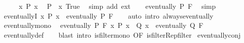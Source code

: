 \begin{isabellebody}
%
\isadelimproof
%
\endisadelimproof
%
\isatagproof
{}\isamarkupfalse%
\ {\isacharminus}{\kern0pt}\isanewline
\ \ \isamarkupfalse%
\ {\isachardoublequoteopen}{\isasymforall}x{\isachardot}{\kern0pt}\ P\ x{\isachardoublequoteclose}\ \isamarkupfalse%
\ {\isachardoublequoteopen}P\ {\isacharequal}{\kern0pt}\ {\isacharparenleft}{\kern0pt}{\isasymlambda}x{\isachardot}{\kern0pt}\ True{\isacharparenright}{\kern0pt}{\isachardoublequoteclose}\ \isamarkupfalse%
\ {\isacharparenleft}{\kern0pt}simp\ add{\isacharcolon}{\kern0pt}\ ext{\isacharparenright}{\kern0pt}\isanewline
\ \ \isamarkupfalse%
\ {\isachardoublequoteopen}eventually\ P\ F{\isachardoublequoteclose}\ \isamarkupfalse%
\ simp\isanewline
{}\isamarkupfalse%
%
\endisatagproof
{\isafoldproof}%
%
\isadelimproof
\isanewline
%
\endisadelimproof
\isanewline
{}\isamarkupfalse%
\ eventuallyI{\isacharcolon}{\kern0pt}\ {\isachardoublequoteopen}{\isacharparenleft}{\kern0pt}{\isasymAnd}x{\isachardot}{\kern0pt}\ P\ x{\isacharparenright}{\kern0pt}\ {\isasymLongrightarrow}\ eventually\ P\ F{\isachardoublequoteclose}\isanewline
%
\isadelimproof
\ \ %
\endisadelimproof
%
\isatagproof
{}\isamarkupfalse%
\ {\isacharparenleft}{\kern0pt}auto\ intro{\isacharcolon}{\kern0pt}\ always{\isacharunderscore}{\kern0pt}eventually{\isacharparenright}{\kern0pt}%
\endisatagproof
{\isafoldproof}%
%
\isadelimproof
\isanewline
%
\endisadelimproof
\isanewline
{}\isamarkupfalse%
\ eventually{\isacharunderscore}{\kern0pt}mono{\isacharcolon}{\kern0pt}\isanewline
\ \ {\isachardoublequoteopen}{\isasymlbrakk}eventually\ P\ F{\isacharsemicolon}{\kern0pt}\ {\isasymAnd}x{\isachardot}{\kern0pt}\ P\ x\ {\isasymLongrightarrow}\ Q\ x{\isasymrbrakk}\ {\isasymLongrightarrow}\ eventually\ Q\ F{\isachardoublequoteclose}\isanewline
%
\isadelimproof
\ \ %
\endisadelimproof
%
\isatagproof
{}\isamarkupfalse%
\ eventually{\isacharunderscore}{\kern0pt}def\isanewline
\ \ \isamarkupfalse%
\ {\isacharparenleft}{\kern0pt}blast\ intro{\isacharcolon}{\kern0pt}\ is{\isacharunderscore}{\kern0pt}filter{\isachardot}{\kern0pt}mono\ {\isacharbrackleft}{\kern0pt}OF\ is{\isacharunderscore}{\kern0pt}filter{\isacharunderscore}{\kern0pt}Rep{\isacharunderscore}{\kern0pt}filter{\isacharbrackright}{\kern0pt}{\isacharparenright}{\kern0pt}%
\endisatagproof
{\isafoldproof}%
%
\isadelimproof
\isanewline
%
\endisadelimproof
\isanewline
{}\isamarkupfalse%
\ eventually{\isacharunderscore}{\kern0pt}conj{\isacharcolon}{\kern0pt}\isanewline

\end{isabellebody}
